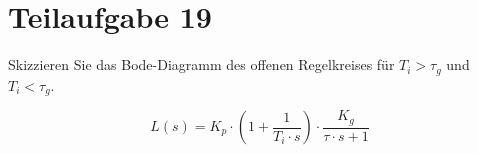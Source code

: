 \section{Teilaufgabe 19}
\begin{aufgabe}
    Skizzieren Sie das Bode-Diagramm des offenen Regelkreises für $T_i > 
    \tau_g$ und $T_i < \tau_g$.
\end{aufgabe}
\[ L(s) = K_p \cdot \left(1 + \frac{1}{T_i \cdot s}\right) 
    \cdot \frac{K_g}{\tau \cdot s + 1}
\]
